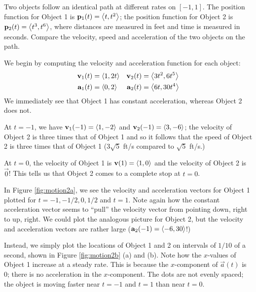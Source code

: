 \documentclass{ximera}
\begin{document}
\begin{example}
  Two objects follow an identical path at different rates on
  $[-1,1]$. The position function for Object 1 is $\mathbf{p}_1(t) =
  \left\langle t, t^2\right\rangle$; the position function for Object 2 is
  $\mathbf{p}_2(t) = \left\langle t^3, t^6\right\rangle$, where distances are measured in
  feet and time is measured in seconds. Compare the velocity, speed
  and acceleration of the two objects on the path.
  \begin{explanation}
    We begin by computing the velocity and acceleration function for
    each object:
    \begin{align*}
      \mathbf v_1(t) &= \left\langle 1,2t\right\rangle & \mathbf v_2(t) &= \left\langle 3t^2,6t^5\right\rangle \\
      \mathbf a_1(t) &= \left\langle 0,2\right\rangle & \mathbf a_2(t) &=\left\langle 6t,30t^4\right\rangle
    \end{align*}
    We immediately see that Object 1 has constant acceleration, whereas Object 2 does not. 
    
    At $t=-1$, we have $\mathbf v_1(-1) = \left\langle 1,-2\right\rangle$ and $\mathbf v_2(-1) =
    \left\langle 3,-6\right\rangle$; the velocity of Object 2 is three times that of Object 1
    and so it follows that the speed of Object 2 is three times that of
    Object 1 ($3\sqrt{5}$ ft/s compared to $\sqrt{5}$ ft/s.)

    At $t=0$, the velocity of Object 1 is $\mathbf v(1) = \left\langle 1,0\right\rangle$ and the
    velocity of Object 2 is $\vec 0$! This tells us that Object 2 comes to
a complete stop at $t=0$.

In Figure \ref{fig:motion2a}, we see the velocity and acceleration
vectors for Object 1 plotted for $t=-1, -1/2, 0, 1/2$ and $t=1$. Note
again how the constant acceleration vector seems to ``pull'' the
velocity vector from pointing down, right to up, right. We could plot
the analogous picture for Object 2, but the velocity and acceleration
vectors are rather large ($\mathbf a_2(-1) = \left\langle -6,30\right\rangle$!)

Instead, we simply plot the locations of Object 1 and 2 on intervals
of $1/10$ of a second, shown in Figure \ref{fig:motion2b}
(a) and (b). Note how the $x$-values of Object 1 increase at a steady
rate. This is because the $x$-component of $\vec a(t)$ is 0; there is
no acceleration in the $x$-component. The dots are not evenly spaced;
the object is moving faster near $t=-1$ and $t=1$ than near $t=0$.


\end{explanation}
\end{example}
\end{document}
